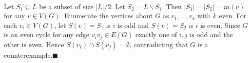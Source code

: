\documentclass[letterpaper,12pt,oneside,onecolumn]{article}
\begin{document}
\paragraph{}
 Let $S_1 \subseteq L$ be a subset of size $|L|/2$. Let $S_2 = L \backslash S_1$. Then $|S_1| = |S_2| = m(v)$ for any $v \in V(G)$. Enumerate the vertices about $G$ as $v_1, \dots, v_k$ with $k$ even. For each $v_i \in V(G)$, let $S(v) = S_1$ is $i$ is odd and $S(v) = S_2$ is $i$ is even. Since $G$ is an even cycle for any edge $v_iv_j \in E(G)$ exactly one of $i,j$ is odd and the other is even. Hence $S(v_i) \cap S(v_j) = \emptyset$, contradicting that $G$ is a counterexample.$\blacksquare$

\newpage
\section{}
\end{document}
